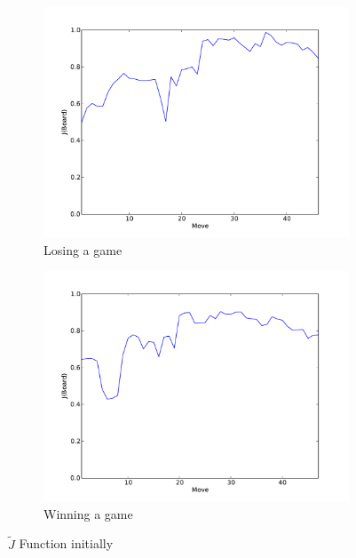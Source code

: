 \documentclass[11pt]{article}
\begin{document}
\begin{figure}[htbp]
  \begin{subfigure}{0.45\textwidth}
    \centering
    \includegraphics[width=\linewidth]{../Graphs/J_improved_1iteration_lost.pdf}
    \caption{Losing a game}
    \label{fig:initial_j_lost}
  \end{subfigure}
  \hspace{1em}
  \begin{subfigure}{0.45\textwidth}
    \centering
    \includegraphics[width=\linewidth]{../Graphs/J_improved_1iteration_won.pdf}
    \caption{Winning a game}
    \label{fig:initial_j_win}
  \end{subfigure}
  \caption{$\tilde{J}$ Function initially}
  \label{fig:initial_j}
\end{figure}
\end{document}
